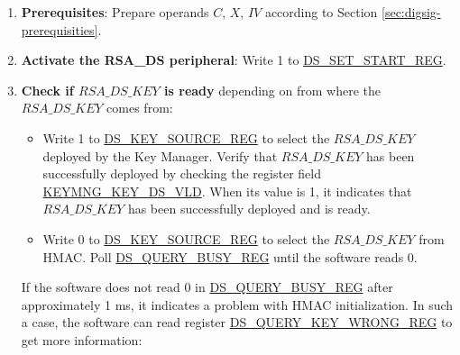 \documentclass[main\_\_EN.tex]{subfiles}
\begin{document}
\begin{enumerate}

    \item {\bfseries Prerequisites}: Prepare operands \begin{math}C\end{math}, \begin{math}X\end{math}, \begin{math}IV\end{math} according to Section \ref{sec:digsig-prerequisities}.

    \item {\bfseries Activate the RSA\_DS peripheral}: Write 1 to \hyperref[regdesc:DSSETSTARTREG]{DS\_SET\_START\_REG}.

    \item {\bfseries Check if \begin{math}RSA\_DS\_KEY\end{math} is ready} depending on from where the \begin{math}RSA\_DS\_KEY\end{math} comes from:
    \begin{itemize}
        \item Write 1 to \hyperref[regdesc:DSKEYSOURCEREG]{DS\_KEY\_SOURCE\_REG} to select the \begin{math}RSA\_DS\_KEY\end{math} deployed by the Key Manager. Verify that \begin{math}RSA\_DS\_KEY\end{math} has been successfully deployed by checking the register field \hyperref[fielddesc:KEYMNGKEYDSVLD]{KEYMNG\_KEY\_DS\_VLD}. When its value is 1, it indicates that \begin{math}RSA\_DS\_KEY\end{math} has been successfully deployed and is ready.
        \item Write 0 to \hyperref[regdesc:DSKEYSOURCEREG]{DS\_KEY\_SOURCE\_REG} to select the \begin{math}RSA\_DS\_KEY\end{math} from HMAC. Poll \hyperref[regdesc:DSQUERYBUSYREG]{DS\_QUERY\_BUSY\_REG} until the software reads 0.
    \end{itemize}

    If the software does not read 0 in \hyperref[regdesc:DSQUERYBUSYREG]{DS\_QUERY\_BUSY\_REG} after approximately 1 ms, it indicates a problem with HMAC initialization. In such a case, the software can read register \hyperref[regdesc:DSQUERYKEYWRONGREG]{DS\_QUERY\_KEY\_WRONG\_REG} to get more information:


\end{enumerate}
\end{document}
